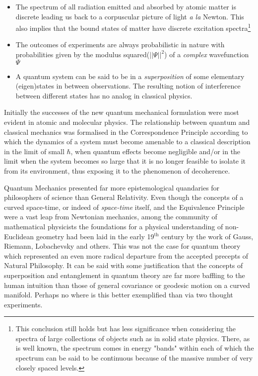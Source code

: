 \documentclass[11pt,english,rmp]{revtex4}
\begin{document}
\begin{itemize}
\item The spectrum of all radiation emitted and absorbed by atomic matter is discrete leading us back to a corpuscular picture of light \emph{a la} Newton. This also implies that the bound states of matter have discrete excitation spectra\footnote{This conclusion still holds but has less significance when considering the spectra of large collections of objects such as in solid state physics. There, as is well known, the spectrum comes in energy "bands" within each of which the spectrum can be said to be continuous because of the massive number of very closely spaced levels.}
\item The outcomes of experiments are always probabilistic in nature with probabilities given by the modulus squared($||\Psi||^{2}$) of a \emph{complex} wavefunction $\Psi$
\item A quantum system can be said to be in a \emph{superposition} of some elementary (eigen)states in between observations. The resulting notion of interference between different states has no analog in classical physics.
\end{itemize}

Initially the successes of the new quantum mechanical formulation were most evident in atomic and molecular physics. The relationship between quantum and classical mechanics was formalised in the Correspondence Principle according to which the dynamics of a system must become amenable to a classical description in the limit of small $\hbar$, when quantum effects become negligible and/or in the limit when the system becomes so large that it is no longer feasible to isolate it from its environment, thus exposing it to the phenomenon of decoherence.

Quantum Mechanics presented far more epistemological quandaries for philosophers of science than General Relativity. Even though the concepts of a curved space-time, or indeed of \emph{space-time} itself, and the Equivalence Principle were a vast leap from Newtonian mechanics, among the community of mathematical physicists the foundations for a physical understanding of non-Euclidean geometry had been laid in the early 19$^\textrm{th}$ century by the work of Gauss, Riemann, Lobachevsky and others. This was not the case for quantum theory which represented an even more radical departure from the accepted precepts of Natural Philosophy. It can be said with some justification that the concepts of superposition and entanglement in quantum theory are far more baffling to the human intuition than those of general covariance or geodesic motion on a curved manifold. Perhaps no where is this better exemplified than via two thought experiments. 
\end{document}
